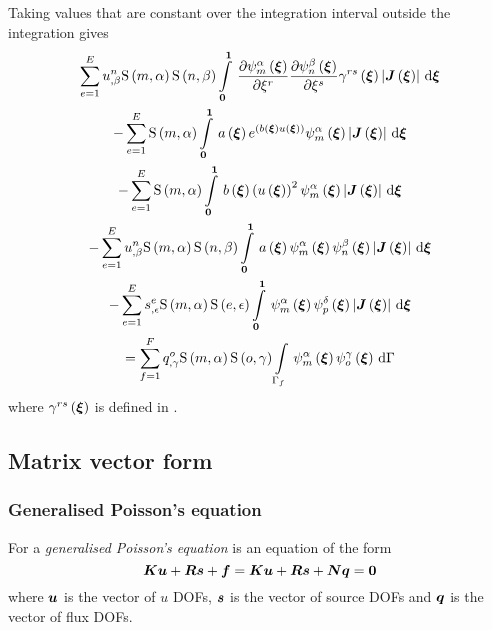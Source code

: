 Taking values that are constant over the integration interval outside the
integration gives
\begin{multline}
  \dsum_{e=1}^{E}\nodedof{u}{n}{\beta}\gsf{m}{\alpha}\gsf{n}{\beta}
  \gint{\vectr{0}}{\vectr{1}}{\delby{\gbfn{m}{\alpha}{\vectr{\xi}}}{\xi^{r}}
  \delby{\gbfn{n}{\beta}{\vectr{\xi}}}{\xi^{s}}\fnof{\gamma^{rs}}{\vectr{\xi}}
  \abs{\fnof{\matr{J}}{\vectr{\xi}}}}{\vectr{\xi}} \\ 
  -\dsum_{e=1}^{E}\gsf{m}{\alpha}\gint{\vectr{0}}{\vectr{1}}{\fnof{a}{\vectr{\xi}}
    e^{\pbrac{\fnof{b}{\vectr{\xi}}\fnof{u}{\vectr{\xi}}}}
    \gbfn{m}{\alpha}{\vectr{\xi}}\abs{\fnof{\matr{J}}{\vectr{\xi}}}}{\vectr{\xi}}\\
  -\dsum_{e=1}^{E}\gsf{m}{\alpha}\gint{\vectr{0}}{\vectr{1}}{\fnof{b}{\vectr{\xi}}
    \pbrac{\fnof{u}{\vectr{\xi}}}^{2}
    \gbfn{m}{\alpha}{\vectr{\xi}}\abs{\fnof{\matr{J}}{\vectr{\xi}}}}{\vectr{\xi}}\\
  -\dsum_{e=1}^{E}\nodedof{u}{n}{\beta}\gsf{m}{\alpha}\gsf{n}{\beta}
  \gint{\vectr{0}}{\vectr{1}}{\fnof{a}{\vectr{\xi}}\gbfn{m}{\alpha}{\vectr{\xi}}
    \gbfn{n}{\beta}{\vectr{\xi}}\abs{\fnof{\matr{J}}{\vectr{\xi}}}}{\vectr{\xi}}\\  
  -\dsum_{e=1}^{E}\nodedof{s}{e}{\epsilon}\gsf{m}{\alpha}\gsf{e}{\epsilon}
  \gint{\vectr{0}}{\vectr{1}}{\gbfn{m}{\alpha}{\vectr{\xi}}
    \gbfn{p}{\delta}{\vectr{\xi}}\abs{\fnof{\matr{J}}{\vectr{\xi}}}}{\vectr{\xi}}\\
  =\dsum_{f=1}^{F}\nodedof{q}{o}{\gamma}\gsf{m}{\alpha}\gsf{o}{\gamma}
  \gint{\Gamma_{f}}{}{\gbfn{m}{\alpha}{\vectr{\xi}}\gbfn{o}{\gamma}{\vectr{\xi}}
  }{\Gamma}
  \label{eqn:PoissonFemForm}
\end{multline}
where $ \gamma^{rs}\left(  \boldsymbol{\xi}  \right) $ is defined in 
.

\subsection{Matrix vector form}

\subsubsection{Generalised Poisson's equation}

For a \emph{generalised Poisson's equation}  is an equation of the form
\begin{equation}
  \matr{K}\vect{u}+\matr{R}\vect{s}+\vect{f}=\matr{K}\vect{u}+\matr{R}\vect{s}+\matr{N}\vect{q}=\vect{0}
\end{equation}
where $\vect{u}$ is the vector of $u$ DOFs, $\vect{s}$ is the vector of source
DOFs and $ \boldsymbol{q} $ is the vector of flux DOFs.

